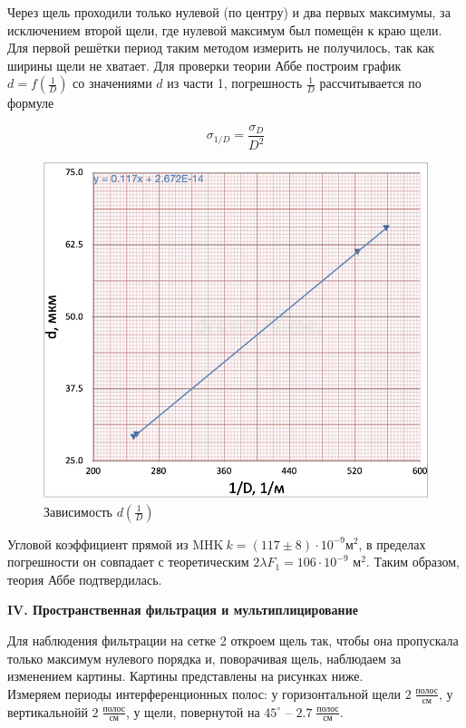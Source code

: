 \documentclass[12pt,a4paper]{article}
\begin{document}
    Через щель проходили только нулевой (по центру) и два первых максимумы, за исключением второй щели, где нулевой максимум был помещён к краю щели. Для первой решётки
    период таким методом измерить не получилось, так как ширины щели не хватает.
    Для проверки теории Аббе построим график $d=f\left(\frac{1}{D}\right)$ со значениями $d$ из части 1, погрешность $\frac{1}{D}$ рассчитывается по формуле
    
    $$
        \sigma_{1 / D}=\frac{\sigma_{D}}{D^{2}}
    $$
    
		\begin{figure}[H]
			\centering
			\includegraphics[width=0.8\linewidth]{src/plot.png}
			\caption{Зависимость $d\left( \frac{1}{D} \right)$}
		\end{figure}

    Угловой коэффициент прямой из $\text{MHK}\ k=(117 \pm 8) \cdot 10^{-9} {\text{м}}^{2}$, в пределах погрешности он совпадает с теоретическим $2 \lambda F_{1}= 106\cdot 10^{-9} {\text{ м}}^{2} .$ Таким образом, теория Аббе подтвердилась. 



	\begin{center}
		\textbf{IV. Пространственная фильтрация и мультиплицирование}
	\end{center}


    Для наблюдения фильтрации на сетке 2 откроем щель так, чтобы она пропускала только максимум нулевого порядка и, поворачивая щель, наблюдаем за изменением картины. Картины представлены на рисунках ниже. \\

    Измеряем периоды интерференционных полос: у горизонтальной щели $2 \; \frac{\text{полос}}{\text{см}}$, у вертикальнойй $2 \; \frac{\text{полос}} {\text{см}}$, у щели, повернутой на $45^{\circ}$ -- $2.7 \; \frac{\text{полос}}{\text{см}}$.
\end{document}
